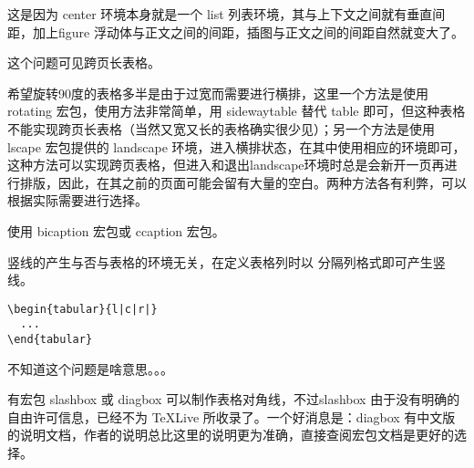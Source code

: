 这是因为 center 环境本身就是一个 list
列表环境，其与上下文之间就有垂直间距，加上figure
浮动体与正文之间的间距，插图与正文之间的间距自然就变大了。



这个问题可见跨页长表格。



希望旋转90度的表格多半是由于过宽而需要进行横排，这里一个方法是使用
rotating 宏包，使用方法非常简单，用 sidewaytable 替代 table
即可，但这种表格不能实现跨页长表格（当然又宽又长的表格确实很少见）；另一个方法是使用lscape
宏包提供的 landscape
环境，进入横排状态，在其中使用相应的环境即可，这种方法可以实现跨页表格，但进入和退出landscape环境时总是会新开一页再进行排版，因此，在其之前的页面可能会留有大量的空白。两种方法各有利弊，可以根据实际需要进行选择。



\listoftables
\listoffigures



使用 bicaption 宏包或 ccaption 宏包。



竖线的产生与否与表格的环境无关，在定义表格列时以 \textbar{}
分隔列格式即可产生竖线。
\begin{verbatim}
\begin{tabular}{l|c|r|}
  ...
\end{tabular}
\end{verbatim}







不知道这个问题是啥意思。。。



有宏包 slashbox 或 diagbox 可以制作表格对角线，不过slashbox
由于没有明确的自由许可信息，已经不为 TeXLive
所收录了。一个好消息是：diagbox
有中文版的说明文档，作者的说明总比这里的说明更为准确，直接查阅宏包文档是更好的选择。
